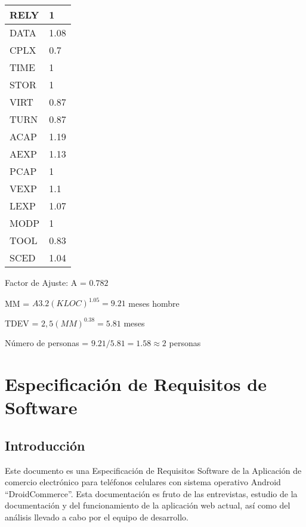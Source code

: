 \begin{table}[H]
\centering
    \begin{tabular}{|l|l|}
        \hline
        RELY & 1    \\ \hline
        DATA & 1.08 \\ \hline
        CPLX & 0.7  \\ \hline
        TIME & 1    \\ \hline
        STOR & 1    \\ \hline
        VIRT & 0.87 \\ \hline
        TURN & 0.87 \\ \hline
        ACAP & 1.19 \\ \hline
        AEXP & 1.13 \\ \hline
        PCAP & 1    \\ \hline
        VEXP & 1.1  \\ \hline
        LEXP & 1.07 \\ \hline
        MODP & 1    \\ \hline
        TOOL & 0.83 \\ \hline
        SCED & 1.04 \\
        \hline
    \end{tabular}
\end{table}
    
    
Factor de Ajuste: A = $0.782$
\\

\begin{framed}
\centering
MM = $A 3.2 (KLOC)^{1.05} = 9.21$ meses hombre

TDEV = $2,5 (MM)^{0.38} = 5.81$ meses

Número de personas = ${9.21}/{5.81} = 1.58 \approx 2$ personas
\end{framed}

\section{Especificación de Requisitos de Software}
\setcounter{secnumdepth}{2}
\renewcommand{\thesubsection}{\arabic{subsection}}
 \subsection{Introducción}
 
 Este documento es una Especificación de Requisitos Software de la Aplicación de comercio electrónico para teléfonos celulares con sistema operativo Android “DroidCommerce”. Esta documentación es fruto de las entrevistas, estudio de la documentación y del funcionamiento de la aplicación web actual, así como del análisis llevado a cabo por el equipo de desarrollo.

